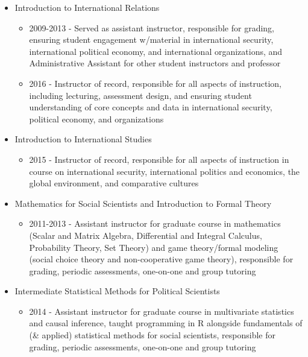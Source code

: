 \documentclass[10pt,letterpaper,unicode]{moderncv}        %
\newenvironment{mcvitemize}
{%
    \addtolength{\leftmargini}{\dimexpr\hintscolumnwidth+\separatorcolumnwidth}
    \small
    \begin{itemize}
}{%
    \end{itemize}
}
\begin{document}
\begin{mcvitemize}%
	\item Introduction to International Relations
		\begin{itemize}
			\item 2009-2013 - Served as assistant instructor, responsible for grading, ensuring student engagement w/material in international security, international political economy, and international organizations, and Administrative Assistant for other student instructors and professor
			\item 2016 - Instructor of record, responsible for all aspects of instruction, including lecturing, assessment design, and ensuring student understanding of core concepts and data in international security, political economy, and organizations
		\end{itemize}
	\item Introduction to International Studies
		\begin{itemize}
			\item 2015 - Instructor of record, responsible for all aspects of instruction in course on international security, international politics and economics, the global environment, and comparative cultures
		\end{itemize}
	\item Mathematics for Social Scientists and Introduction to Formal Theory
		\begin{itemize}
			\item 2011-2013 - Assistant instructor for graduate course in mathematics (Scalar and Matrix Algebra, Differential and Integral Calculus, Probability Theory, Set Theory) and game theory/formal modeling (social choice theory and non-cooperative game theory), responsible for grading, periodic assessments, one-on-one and group tutoring
		\end{itemize}
	\item Intermediate Statistical Methods for Political Scientists
		\begin{itemize}
			\item 2014 - Assistant instructor for graduate course in multivariate statistics and causal inference, taught programming in R alongside fundamentals of (\& applied) statistical methods for social scientists, responsible for grading, periodic assessments, one-on-one and group tutoring
		\end{itemize}
\end{mcvitemize}
\end{document}
